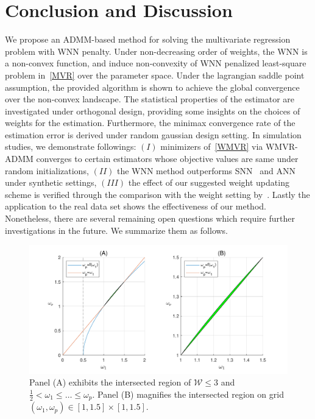 \documentclass[alpha-refs]{wiley-article}
\begin{document}
\section{Conclusion and Discussion} \label{Disc}
We propose an ADMM-based method for solving the multivariate regression problem with WNN penalty.
Under non-decreasing order of weights, the WNN is a non-convex function, and induce non-convexity of WNN penalized least-square
problem in~\eqref{MVR} over the parameter space.
Under the lagrangian saddle point assumption, the provided algorithm is shown to achieve the global convergence over the non-convex landscape.
The statistical properties of the estimator are investigated under orthogonal design, providing some insights on the choices of weights for the estimation.
Furthermore, the minimax convergence rate of the estimation error is derived under random gaussian design setting.
In simulation studies, we demonstrate followings:
$(I)$  minimizers of~\eqref{WMVR} via WMVR-ADMM converges to certain estimators whose objective values are same under random initializations,
$(II)$ the WNN method outperforms SNN~\citep{yuan2007dimension} and ANN~\citep{chen2013reduced} under synthetic settings,
$(III)$ the effect of our suggested weight updating scheme is verified through the comparison with the weight setting by~\citet{chen2013reduced}.
Lastly the application to the real data set shows the effectiveness of our method.
Nonetheless, there are several remaining open questions which require further investigations in the future.
We summarize them as follows.
\begin{figure} [t!]
  \includegraphics[width=130mm]{Figure/Fig3.pdf}
  \centering
  \caption{Panel (A) exhibits the intersected region of $\mathcal{W} \leq 3$ and $\frac{1}{2} < \omega_{1} \leq \dots \leq \omega_{p}$. Panel (B) magnifies the intersected region on grid $(\omega_{1},\omega_{p})\in[1,1.5] \times [1,1.5]$. }
  \label{Fig6}
\end{figure}
\end{document}
